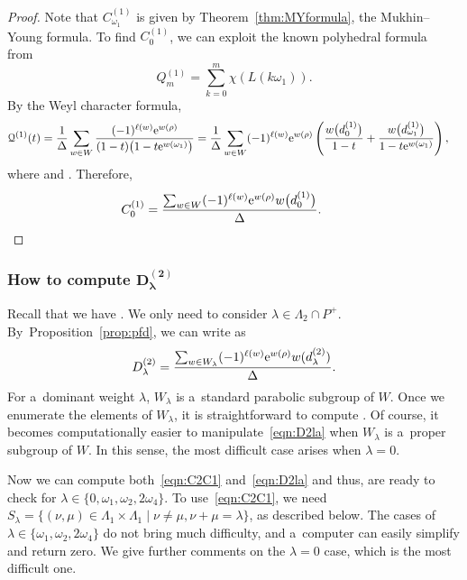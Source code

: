 \documentclass[pdftex]{sigma}
\numberwithin{equation}{section}
\theoremstyle{definition}
\newcommand{\PP}[2]{P^{(#1)}_{#2}}
\newcommand\La{\Lambda}
\newcommand\la{\lambda}
\begin{document}
\begin{proof}
Note that $C^{(1)}_{\omega_1}$ is given by Theorem~\ref{thm:MYformula}, the Mukhin--Young formula. To find $C^{(1)}_{0}$, we can exploit the known polyhedral formula from~\cite{MR1836791}
\begin{equation}\label{Qonem}
Q^{(1)}_m = \sum_{k=0}^{m}\chi(L(k\omega_1)).
\end{equation}
By the Weyl character formula,
\begin{align*}
\mathcal{Q}^{(1)}(t) & = \frac{1}{\Delta}\sum_{w\in W} \frac{(-1)^{\ell(w)}{\rm e}^{w(\rho)}}{(1-t)\bigl(1-t {\rm e}^{w(\omega_1)}\bigr)} = \frac{1}{\Delta}\sum_{w\in W}(-1)^{\ell(w)}{\rm e}^{w(\rho)}\left(\frac{w\bigl(d^{(1)}_{0}\bigr)}{1-t}+\frac{w\bigl(d^{(1)}_{\omega_1}\bigr)}{1-t {\rm e}^{w(\omega_1)}}\right),
\end{align*}
where
 and .
Therefore,
\[
C^{(1)}_{0} = \frac{\sum_{w\in W}(-1)^{\ell(w)}{\rm e}^{w(\rho)}w\bigl(d^{(1)}_{0}\bigr)}{\Delta}.\tag*{\qed}
\] \renewcommand{\qed}{}
\end{proof}

\subsubsection*{How to compute $\boldsymbol{D^{(2)}_{\la}}$}
Recall that we have
\smash{$
\PP2m =\sum_{\la\in \La_2} D^{(2)}_{\la}{\rm e}^{m \la}$}.
We only need to consider $\la \in \La_2\cap P^+$.
By~Proposi\-tion~\ref{prop:pfd}, we can write \smash{$D^{(2)}_{\la}$} as
\begin{equation}\label{eqn:D2la}
D^{(2)}_{\la} = \frac{\sum_{w\in W_{\la}}(-1)^{\ell(w)}{\rm e}^{w(\rho)}w(d^{(2)}_{\la})}{\Delta}.
\end{equation}
For a~dominant weight $\la$, $W_{\la}$ is a~standard parabolic subgroup of $W$. Once we enumerate the elements of $W_{\la}$, it is straightforward to compute \smash{$D^{(2)}_{\la}$}. Of course, it becomes computationally easier to manipulate~\eqref{eqn:D2la} when $W_{\la}$ is a~proper subgroup of $W$. In this sense, the most difficult case arises when $\la=0$.

Now we can compute both~\eqref{eqn:C2C1} and~\eqref{eqn:D2la} and thus, are ready to check \smash{$C^{(2)}_{\la} = D^{(2)}_{\la}$} for $\la \in \{0,\omega_1,\omega_2,2 \omega_4\}$. To use~\eqref{eqn:C2C1}, we need $S_{\la} =\{(\nu,\mu)\in \La_1\times \La_1\mid \nu \neq \mu, \nu+\mu = \la\}$, as described below. The cases of $\la \in \{\omega_1,\omega_2,2 \omega_4\}$ do not bring much difficulty, and a~computer can easily simplify \smash{$C^{(2)}_{\la} - D^{(2)}_{\la}$} and return zero.
We give further comments on the $\la=0$ case, which is the most difficult one.
\end{document}
